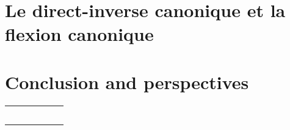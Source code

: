 \documentclass[utf8]{beamer}
\begin{document}
\section[DIR/INV par rapport à la flexion canonique]{Le direct-inverse canonique et la flexion canonique}


\section[Conclusion]{Conclusion and perspectives}


\begin{frame}[t]{}
\vspace*{3cm}
\begin{center}
\Large 
\begin{tabular}{x{1.5cm}x{1.5cm}x{1.5cm}x{1.5cm}x{1.5cm}x{1.5cm}}
&&&&\\
&&&&\\
&&&&\\
&&&&\\
&&&&\\
\end{tabular}
\end{center}

\end{frame}



%
%
%  
% 



%

\end{document}
